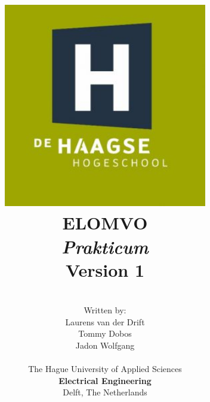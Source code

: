 \title{
\includegraphics[width=3.5in]{img/logo.jpg} \\
\vspace*{1in}
\textbf{ELOMVO}\\
\textit{Prakticum}\\
Version 1
}
\author{
\vspace*{0.5in} \\
  Written by:\\
  Laurens van der Drift\\
  Tommy Dobos\\
  Jadon Wolfgang\\
\vspace*{0.2in} \\
    The Hague University of Applied Sciences\\
    \textbf{Electrical Engineering}\\
    Delft, The Netherlands
   } 